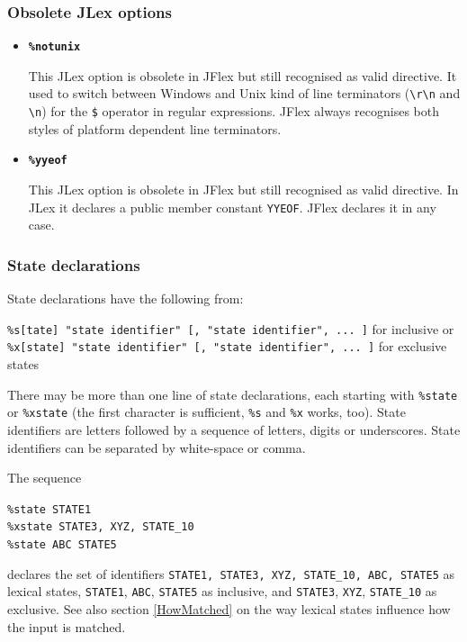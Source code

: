 \documentclass[11pt]{scrartcl}
\begin{document}
\subsubsection{Obsolete JLex options\label{Obsolete}}
\begin{itemize}
\item
{\bf \texttt{\%notunix}}

This JLex option is obsolete in JFlex but still recognised as valid directive.
It used to switch between Windows and Unix kind of line terminators (\verb+\r\n+
and \verb+\n+) for the \texttt{\$} operator in regular expressions. JFlex
always recognises both styles of platform dependent line terminators.
 
\item
{\bf \texttt{\%yyeof}}

This JLex option is obsolete in JFlex but still recognised as valid directive.
In JLex it declares a public member constant \texttt{YYEOF}. JFlex declares it in any case.
\end{itemize}

\subsubsection{State declarations\label{StateDecl}}
State declarations have the following from:

\texttt{\%s[tate] "state identifier" [, "state identifier", ... ]} for inclusive or\\
\texttt{\%x[state] "state identifier" [, "state identifier", ... ]} for exclusive states

There may be more than one line of state declarations, each starting with
\texttt{\%state} or \texttt{\%xstate} (the first character is sufficient,
\texttt{\%s} and \texttt{\%x} works, too). State identifiers are letters followed 
by a sequence of letters, digits or underscores. State identifiers can be separated 
by white-space or comma.

The sequence

\texttt{\%state STATE1}\\
\texttt{\%xstate STATE3, XYZ, STATE\_10}\\
\texttt{\%state ABC STATE5}

declares the set of identifiers \texttt{{STATE1, STATE3, XYZ,
    STATE\_10, ABC, STATE5}} as lexical states, \texttt{STATE1}, \texttt{ABC}, \texttt{STATE5}
as inclusive, and \texttt{STATE3}, \texttt{XYZ}, \texttt{STATE\_10} as exclusive. 
See also section
\ref{HowMatched} on the way lexical states influence how the input is
matched.
 
\end{document}
